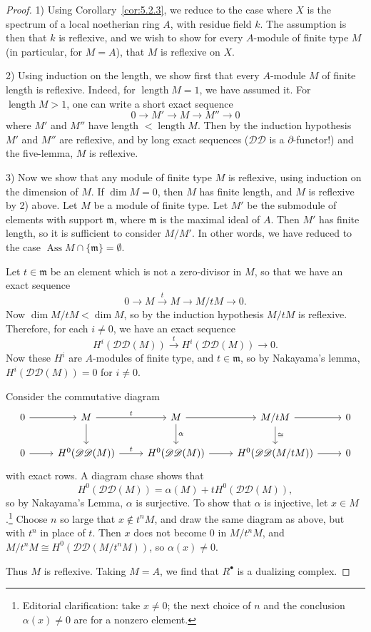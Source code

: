 \begin{proof}
1) Using Corollary~\ref{cor:5.2.3}, we reduce to the case where $X$ is the spectrum of a local noetherian ring $A$, with residue field $k$. The assumption is then that $k$ is reflexive, and we wish to show for every $A$-module of finite type $M$ (in particular, for $M=A$), that $M$ is reflexive on $X$.

2) Using induction on the length, we show first that every $A$-module $M$ of finite length is reflexive. Indeed, for $\operatorname{length}M=1$, we have assumed it. For $\operatorname{length}M>1$, one can write a short exact sequence
\[
0\longrightarrow M'\longrightarrow M\longrightarrow M''\longrightarrow 0
\]
where $M'$ and $M''$ have length $<\operatorname{length}M$. Then by the induction hypothesis $M'$ and $M''$ are reflexive, and by long exact sequences ($\mathscr{D}\mathscr{D}$ is a $\partial$-functor!) and the five-lemma, $M$ is reflexive.

3) Now we show that any module of finite type $M$ is reflexive, using induction on the dimension of $M$. If $\dim M=0$, then $M$ has finite length, and $M$ is reflexive by 2) above. Let $M$ be a module of finite type. Let $M'$ be the submodule of elements with support $\mathfrak{m}$, where $\mathfrak{m}$ is the maximal ideal of $A$. Then $M'$ has finite length, so it is sufficient to consider $M/M'$. In other words, we have reduced to the case $\operatorname{Ass}M\cap\{\mathfrak{m}\}=\emptyset$.

Let $t\in\mathfrak{m}$ be an element which is not a zero-divisor in $M$, so that we have an exact sequence
\[
0\longrightarrow M\xrightarrow{t} M\longrightarrow M/tM\longrightarrow 0.
\]
Now $\dim M/tM<\dim M$, so by the induction hypothesis $M/tM$ is reflexive. Therefore, for each $i\neq0$, we have an exact sequence
\[
H^{i}(\mathscr{D}\mathscr{D}(M))\xrightarrow{t}H^{i}(\mathscr{D}\mathscr{D}(M))\longrightarrow 0.
\]
Now these $H^{i}$ are $A$-modules of finite type, and $t\in\mathfrak{m}$, so by Nakayama's lemma, $H^{i}(\mathscr{D}\mathscr{D}(M))=0$ for $i\neq0$.

Consider the commutative diagram
\[
\begin{tikzcd}
0\ar[r] & M \ar[r,"t"] \ar[d] & M \ar[r] \ar[d,"\alpha"] & M/tM \ar[r] \ar[d,"\cong"] & 0\\
0\ar[r] & H^0(\mathscr{D}\mathscr{D}(M)) \ar[r,"t"] & H^0(\mathscr{D}\mathscr{D}(M)) \ar[r] & H^0(\mathscr{D}\mathscr{D}(M/tM)) \ar[r] & 0
\end{tikzcd}
\]
with exact rows. A diagram chase shows that
\[
H^{0}(\mathscr{D}\mathscr{D}(M))=\alpha(M)+tH^{0}(\mathscr{D}\mathscr{D}(M)),
\]
so by Nakayama's Lemma, $\alpha$ is surjective. To show that $\alpha$ is injective, let $x\in M$.\footnote{Editorial clarification: take $x\neq0$; the next choice of $n$ and the conclusion $\alpha(x)\neq0$ are for a nonzero element.} Choose $n$ so large that $x\notin t^nM$, and draw the same diagram as above, but with $t^n$ in place of $t$. Then $x$ does not become $0$ in $M/t^nM$, and $M/t^nM\cong H^0(\mathscr{D}\mathscr{D}(M/t^nM))$, so $\alpha(x)\neq0$.

Thus $M$ is reflexive. Taking $M=A$, we find that $R^\bullet$ is a dualizing complex.
\end{proof}

